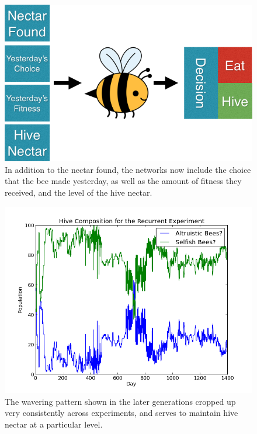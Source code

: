 \documentclass[11pt, letter]{article}
\begin{document}
			\begin{figure}[tbph!]
				\begin{center}
					\includegraphics[scale=.5]{bee_diagrams/recurrent_system.png}
				\end{center}
				\caption{In addition to the nectar found, the networks now include the choice that the bee made yesterday, as well as the amount of fitness they received, and the level of the hive nectar.}
				\label{fig:recurrent_system}
			\end{figure}

			\begin{figure}[tbph!]
				\begin{center}
					\includegraphics[scale=.5]{results/recurrent_comp.png}
				\end{center}
				\caption{The wavering pattern shown in the later generations cropped up very consistently across experiments, and serves to maintain hive nectar at a particular level.}
				\label{fig:recurrent_composition}
			\end{figure}
\end{document}
